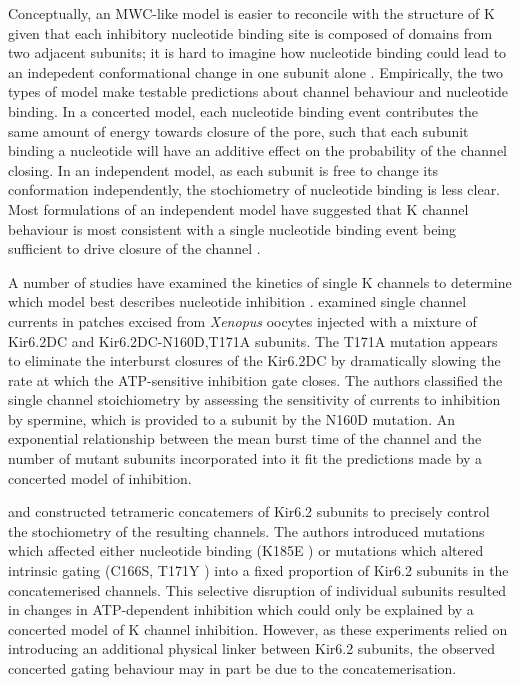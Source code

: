 Conceptually, an MWC-like model is easier to reconcile with the structure of K\ATP{} given that each inhibitory nucleotide binding site is composed of domains from two adjacent subunits; it is hard to imagine how nucleotide binding could lead to an indepedent conformational change in one subunit alone \cite{craig_how_2008-1}.
Empirically, the two types of model make testable predictions about channel behaviour and nucleotide binding.
In a concerted model, each nucleotide binding event contributes the same amount of energy towards closure of the pore, such that each subunit binding a nucleotide will have an additive effect on the probability of the channel closing.
In an independent model, as each subunit is free to change its conformation independently, the stochiometry of nucleotide binding is less clear.
Most formulations of an independent model have suggested that K\ATP{} channel behaviour is most consistent with a single nucleotide binding event being sufficient to drive closure of the channel \cite{trapp_molecular_1998, markworth_atp4-_2000, li_open_2002, fang_n-terminal_2006-1}.

A number of studies have examined the kinetics of single K\ATP{} channels to determine which model best describes nucleotide inhibition \cite{drain_concerted_2004, fang_n-terminal_2006-1, wang_subunit-stoichiometric_2007, craig_how_2008-1}.
\cite{drain_concerted_2004} examined single channel currents in patches excised from \textit{Xenopus} oocytes injected with a mixture of Kir6.2\textgreek{D}C and Kir6.2\textgreek{D}C-N160D,T171A subunits.
The T171A mutation appears to eliminate the interburst closures of the Kir6.2\textgreek{D}C by dramatically slowing the rate at which the ATP-sensitive inhibition gate closes.
The authors classified the single channel stoichiometry by assessing the sensitivity of currents to inhibition by spermine, which is provided to a subunit by the N160D mutation.
An exponential relationship between the mean burst time of the channel and the number of mutant subunits incorporated into it fit the predictions made by a concerted model of inhibition.

\citeauthor{wang_subunit-stoichiometric_2007} and \citeauthor{craig_how_2008-1} constructed tetrameric concatemers of Kir6.2 subunits to precisely control the stochiometry of the resulting channels.
The authors introduced mutations which affected either nucleotide binding (K185E \cite{wang_subunit-stoichiometric_2007, craig_how_2008-1}) or mutations which altered intrinsic gating (C166S, T171Y \cite{wang_subunit-stoichiometric_2007}) into a fixed proportion of Kir6.2 subunits in the concatemerised channels.
This selective disruption of individual subunits resulted in changes in ATP-dependent inhibition which could only be explained by a concerted model of K\ATP{} channel inhibition.
However, as these experiments relied on introducing an additional physical linker between Kir6.2 subunits, the observed concerted gating behaviour may in part be due to the concatemerisation.

